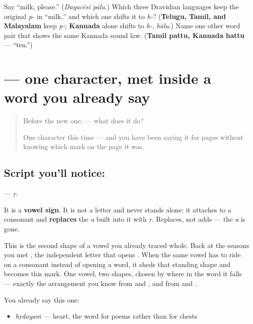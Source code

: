 \begin{tcolorbox}[breakable,colback=teal!4,colframe=teal!35!black,title={Before you move on}]
Say \textquotedblleft{}milk, please.\textquotedblright{} (\emph{Dayacēsi pālu}.) Which three Dravidian languages keep the original \emph{p-} in \textquotedblleft{}milk,\textquotedblright{} and which one shifts it to \emph{h-}? (\textbf{Telugu, Tamil, and Malayalam} keep \emph{p-}; \textbf{Kannada} alone shifts to \emph{h-}, \emph{hālu}.) Name one other word pair that shows the same Kannada sound law. (\textbf{Tamil pattu, Kannada hattu} — \textquotedblleft{}ten.\textquotedblright{})
\end{tcolorbox}
\section[ṛ]{ — one character, met inside a word you already say}

\label{lesson:TE-S131-vowel-sign-vocalic-r}



\begin{quote}
Before the new one:  — what does it do?

One character this time — and you have been saying it for pages without knowing which mark on the page it was.
\end{quote}

\subsection*{Script you'll notice: }
\textbf{} — \emph{ṛ}.

It is a \textbf{vowel sign}. It is not a letter and never stands alone: it attaches to a consonant and \textbf{replaces} the \emph{a} built into it with \emph{ṛ}. Replaces, not adds — the \emph{a} is gone.

This is the second shape of a vowel you already traced whole. Back at the seasons you met \textbf{}, the independent letter that opens \textbf{}. When the same vowel has to ride on a consonant instead of opening a word, it sheds that standing shape and becomes this mark. One vowel, two shapes, chosen by where in the word it falls — exactly the arrangement you know from \textbf{} and \textbf{}, and from \textbf{} and \textbf{}.

You already say this one:

\begin{itemize}
\raggedright
  \item \textbf{} \emph{hṛdayaṁ} — heart, the word for poems rather than for chests
\end{itemize}

